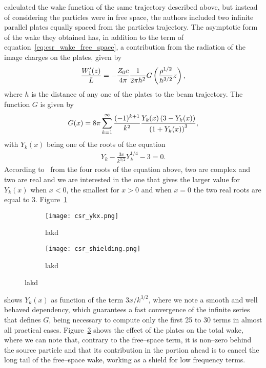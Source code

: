      calculated the wake function of the same trajectory described above, but instead of considering the particles were in free space, the authors included two infinite parallel plates equally spaced from the particles trajectory. The asymptotic form of the wake they obtained has, in addition to the term of equation~\eqref{eq:csr_wake_free_space}, a contribution from the radiation of the image charges on the plates, given by
    \begin{align}\label{eq:csr_wake_shielding}
        \frac{W'_1(z)}{L} = -\frac{Z_0 c}{4\pi}\frac{1}{2\pi h^2} G\left(\frac{\rho^{1/2}}{h^{3/2}}z\right),
    \end{align}
    where $h$ is the distance of any one of the plates to the beam trajectory. The function $G$ is given by
    \begin{align}
        G(x) = 8\pi\sum_{k=1}^\infty \frac{(-1)^{k+1}}{k^2}\frac{Y_k(x)\left(3-Y_k(x)\right)}{\left(1+Y_k(x)\right)^3},
    \end{align}
    with $Y_k(x)$ being one of the roots of the equation
    \begin{align}
        Y_k - \frac{3x}{k^{3/2}}Y_k^{1/4} - 3 = 0.
    \end{align}
    According to~ from the four roots of the equation above, two are complex and two are real and we are interested in the one that gives the larger value for $Y_k(x)$ when $x<0$, the smallest for $x>0$ and when $x=0$ the two real roots are equal to 3. Figure~\ref{fig:csr_ykx}
    \begin{figure}
        \centering
        \begin{subfigure}[c]{0.48\textwidth}
            \centering
            \texttt{[image: csr\_ykx.png]}
            \caption{lakd}
            \label{fig:csr_ykx}
        \end{subfigure}\hfill
        \begin{subfigure}[c]{0.48\textwidth}
            \centering
            \texttt{[image: csr\_shielding.png]}
            \caption{lakd}
            \label{fig:csr_shielding}
        \end{subfigure}
    \end{figure}
    shows $Y_k(x)$ as function of the term $3x/k^{3/2}$, where we note a smooth and well behaved dependency, which guarantees a fast convergence of the infinite series that defines $G$, being necessary to compute only the first 25 to 30 terms in almost all practical cases. Figure~\ref{fig:csr_shielding} shows the effect of the plates on the total wake, where we can note that, contrary to the free--space term, it is non--zero behind the source particle and that its contribution in the portion ahead is to cancel the long tail of the free--space wake, working as a shield for low frequency terms.

